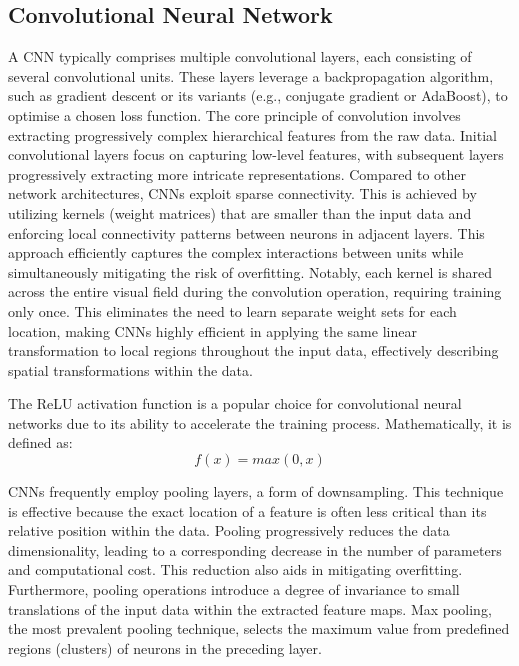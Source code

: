 \documentclass[10pt, a4paper, oneside]{article}
\begin{document}
\subsection{Convolutional Neural Network}
A CNN typically comprises multiple convolutional layers, each consisting of several convolutional units. These layers leverage a backpropagation algorithm, such as gradient descent or its variants (e.g., conjugate gradient or AdaBoost), to optimise a chosen loss function. The core principle of convolution involves extracting progressively complex hierarchical features from the raw data. Initial convolutional layers focus on capturing low-level features, with subsequent layers progressively extracting more intricate representations. Compared to other network architectures, CNNs exploit sparse connectivity. This is achieved by utilizing kernels (weight matrices) that are smaller than the input data and enforcing local connectivity patterns between neurons in adjacent layers. This approach efficiently captures the complex interactions between units while simultaneously mitigating the risk of overfitting. Notably, each kernel is shared across the entire visual field during the convolution operation, requiring training only once. This eliminates the need to learn separate weight sets for each location, making CNNs highly efficient in applying the same linear transformation to local regions throughout the input data, effectively describing spatial transformations within the data.

The ReLU activation function is a popular choice for convolutional neural networks due to its ability to accelerate the training process. Mathematically, it is defined as:
\begin{equation}
    f(x) = max(0, x)
\end{equation}

CNNs frequently employ pooling layers, a form of downsampling. This technique is effective because the exact location of a feature is often less critical than its relative position within the data. Pooling progressively reduces the data dimensionality, leading to a corresponding decrease in the number of parameters and computational cost. This reduction also aids in mitigating overfitting. Furthermore, pooling operations introduce a degree of invariance to small translations of the input data within the extracted feature maps.  Max pooling, the most prevalent pooling technique, selects the maximum value from predefined regions (clusters) of neurons in the preceding layer.
\end{document}
